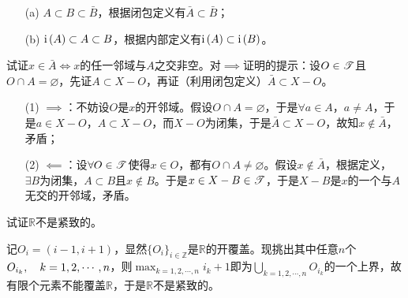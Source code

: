 \begin{xiti}
	\begin{zm}
		\begin{enumerate}
			\item[(a)] $A\subset B\subset\bar{B} $，根据闭包定义有$\bar{A}\subset\bar{B} $；
			\item[(b)] $\mathrm{i}\left( A \right)\subset A\subset B $，根据内部定义有$\mathrm{i}\left( A \right)\subset \mathrm{i}\left( B \right) $。
		\end{enumerate}
	\end{zm}

	\item 试证$x\in \bar{A}\iff x $的任一邻域与$A$之交非空。对$\implies$证明的提示：设$O\in \mathscr{T}$且$O\cap A=\varnothing$，先证$A\subset X-O$，再证（利用闭包定义）$\bar{A}\subset X-O$。

	\begin{zm}
		\begin{enumerate}
			\item[(1)] $\implies$：不妨设$O$是$x$的开邻域。假设$O\cap A=\varnothing$，于是$\forall a\in A$，$a\neq A $，于是$a\in X-O$，$A\subset X-O$，而$X-O$为闭集，于是$\bar{A}\subset X-O$，故知$x\notin\bar{A} $，矛盾；
			\item[(2)] $\impliedby$：设$\forall O\in \mathscr{T}$使得$x\in O$，都有$O\cap A\neq \varnothing$。假设$x\notin \bar{A}$，根据定义，$\exists B$为闭集，$A\subset B$且$x\notin B$。于是$x\in X-B \in\mathscr{T}$，于是$X-B$是$x$的一个与$A$无交的开邻域，矛盾。
		\end{enumerate}
	\end{zm}

	\item 试证$\mathbb{R}$不是紧致的。

	\begin{zm}
		记$O_i=(i-1,i+1)$，显然$\{O_i\}_{i\in\mathbb{Z}}$是$\mathbb{R}$的开覆盖。现挑出其中任意$n$个$O_{i_k}\qc k=1,2,\cdots,n$，则$\displaystyle\max_{k=1,2,\cdots,n} i_k+1$即为$\displaystyle\bigcup_{k=1,2,\cdots,n}O_{i_k} $的一个上界，故有限个元素不能覆盖$\mathbb{R}$，于是$\mathbb{R}$不是紧致的。
	\end{zm}

\end{xiti}
